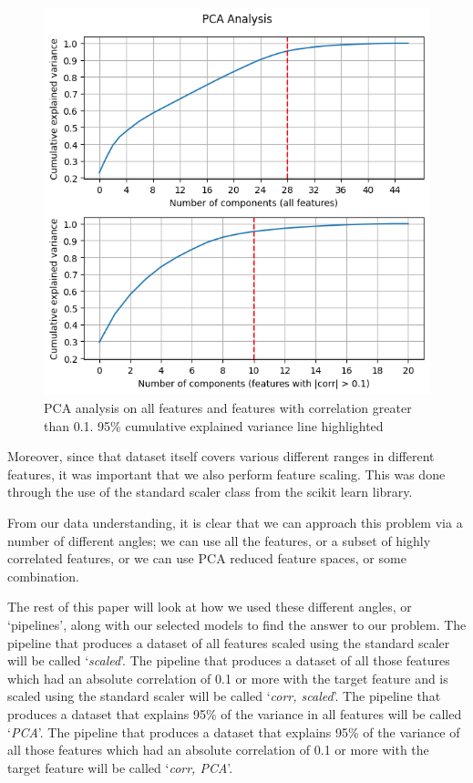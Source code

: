\begin{figure}[!htb]
    \centering
    \includegraphics[width=1\linewidth]{figures//uploads/pca.png}
    \caption{PCA analysis on all features and features with correlation greater than 0.1. 95\% cumulative explained variance line highlighted}
    \label{fig:pca-all}
\end{figure}

Moreover, since that dataset itself covers various different ranges in different features, it was important that we also perform feature scaling. This was done through the use of the standard scaler class from the scikit learn library.

From our data understanding, it is clear that we can approach this problem via a number of different angles; we can use all the features, or a subset of highly correlated features, or we can use PCA reduced feature spaces, or some combination. 

The rest of this paper will look at how we used these different angles, or `pipelines', along with our selected models to find the answer to our problem. The pipeline that produces a dataset of all features scaled using the standard scaler will be called `\textit{scaled}'. The pipeline that produces a dataset of all those features which had an absolute correlation of 0.1 or more with the target feature and is scaled using the standard scaler will be called `\textit{corr, scaled}'. The pipeline that produces a dataset that explains 95\% of the variance in all features will be called `\textit{PCA}'. The pipeline that produces a dataset that explains 95\% of the variance of all those features which had an absolute correlation of 0.1 or more with the target feature will be called `\textit{corr, PCA}'.

